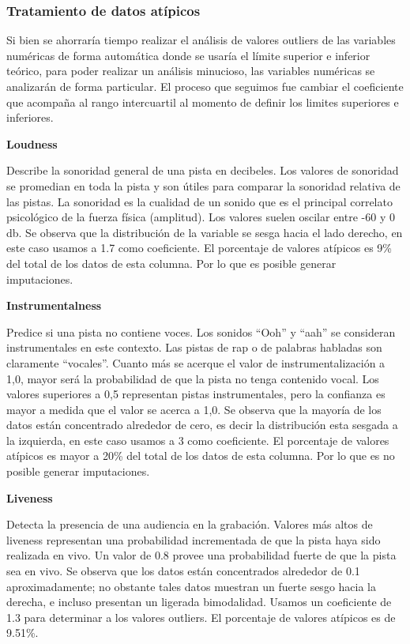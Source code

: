 \documentclass[
  letterpaper,
  DIV=11,
  numbers=noendperiod]{scrartcl}
\begin{document}
\hypertarget{tratamiento-de-datos-atuxedpicos}{%
\subsubsection{Tratamiento de datos
atípicos}\label{tratamiento-de-datos-atuxedpicos}}

Si bien se ahorraría tiempo realizar el análisis de valores outliers de
las variables numéricas de forma automática donde se usaría el límite
superior e inferior teórico, para poder realizar un análisis minucioso,
las variables numéricas se analizarán de forma particular. El proceso
que seguimos fue cambiar el coeficiente que acompaña al rango
intercuartil al momento de definir los limites superiores e inferiores.

\textbf{Loudness}

Describe la sonoridad general de una pista en decibeles. Los valores de
sonoridad se promedian en toda la pista y son útiles para comparar la
sonoridad relativa de las pistas. La sonoridad es la cualidad de un
sonido que es el principal correlato psicológico de la fuerza física
(amplitud). Los valores suelen oscilar entre -60 y 0 db. Se observa que
la distribución de la variable se sesga hacia el lado derecho, en este
caso usamos a 1.7 como coeficiente. El porcentaje de valores atípicos es
9\% del total de los datos de esta columna. Por lo que es posible
generar imputaciones.

\textbf{Instrumentalness}

Predice si una pista no contiene voces. Los sonidos ``Ooh'' y ``aah'' se
consideran instrumentales en este contexto. Las pistas de rap o de
palabras habladas son claramente ``vocales''. Cuanto más se acerque el
valor de instrumentalización a 1,0, mayor será la probabilidad de que la
pista no tenga contenido vocal. Los valores superiores a 0,5 representan
pistas instrumentales, pero la confianza es mayor a medida que el valor
se acerca a 1,0. Se observa que la mayoría de los datos están
concentrado alrededor de cero, es decir la distribución esta sesgada a
la izquierda, en este caso usamos a 3 como coeficiente. El porcentaje de
valores atípicos es mayor a 20\% del total de los datos de esta columna.
Por lo que es no posible generar imputaciones.

\textbf{Liveness}

Detecta la presencia de una audiencia en la grabación. Valores más altos
de liveness representan una probabilidad incrementada de que la pista
haya sido realizada en vivo. Un valor de 0.8 provee una probabilidad
fuerte de que la pista sea en vivo. Se observa que los datos están
concentrados alrededor de 0.1 aproximadamente; no obstante tales datos
muestran un fuerte sesgo hacia la derecha, e incluso presentan un
ligerada bimodalidad. Usamos un coeficiente de 1.3 para determinar a los
valores outliers. El porcentaje de valores atípicos es de 9.51\%.
\end{document}
